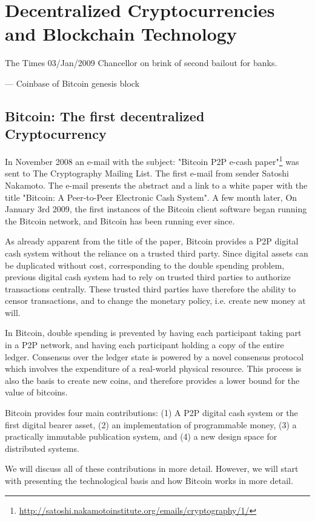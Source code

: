 \chapter{Decentralized Cryptocurrencies and Blockchain Technology}
\label{sec:crypto}

\epigraph{The Times 03/Jan/2009 Chancellor on brink of second bailout for banks.}{--- \textup{Coinbase of Bitcoin genesis block}}


\section{Bitcoin: The first decentralized Cryptocurrency}

 In November 2008 an e-mail with the subject: "Bitcoin P2P e-cash paper"\footnote{\url{http://satoshi.nakamotoinstitute.org/emails/cryptography/1/}} was sent to The Cryptography Mailing List. The first e-mail from sender Satoshi Nakamoto. The e-mail presents the abstract and a link to a white paper with the title "Bitcoin: A Peer-to-Peer Electronic Cash System". A few month later, On January 3rd 2009, the first instances of the Bitcoin client software began running the Bitcoin network, and Bitcoin has been running ever since. 

 As already apparent from the title of the paper, Bitcoin provides a P2P digital cash system without the reliance on a trusted third party. Since digital assets can be duplicated without cost, corresponding to the double spending problem, previous digital cash system had to rely on trusted third parties to authorize transactions centrally. These trusted third parties have therefore the ability to censor transactions, and to change the monetary policy, i.e. create new money at will. 

 In Bitcoin, double spending is prevented by having each participant taking part in a P2P network, and having each participant holding a copy of the entire ledger. Consensus over the ledger state is powered by a novel consensus protocol which involves the expenditure of a real-world physical resource. This process is also the basis to create new coins, and therefore provides a lower bound for the value of bitcoins. 

Bitcoin provides four main contributions: (1) A P2P digital cash system or the first digital bearer asset, (2) an implementation of programmable money, (3) a practically immutable publication system, and (4) a new design space for distributed systems. 

We will discuss all of these contributions in more detail. However, we will start with presenting the technological basis and how Bitcoin works in more detail.

